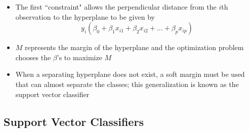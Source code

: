 \documentclass[12pt]{article}
\begin{document}
\begin{itemize}
\item The first ``constraint" allows the perpendicular distance from the $i$th observation to the hyperplane to be given by $$ y_i(\beta_0 + \beta_1x_{i1} + \beta_2x_{i2} + \dots + \beta_px_{ip}) $$ 
\item $M$ represents the margin of the hyperplane and the optimization problem chooses the $\beta$'s to maximize $M$ 
\item When a separating hyperplane does not exist, a soft margin must be used that can almost separate the classes; this generalization is known as the support vector classifier 
\end{itemize}

\subsection{Support Vector Classifiers} 
\end{document}
